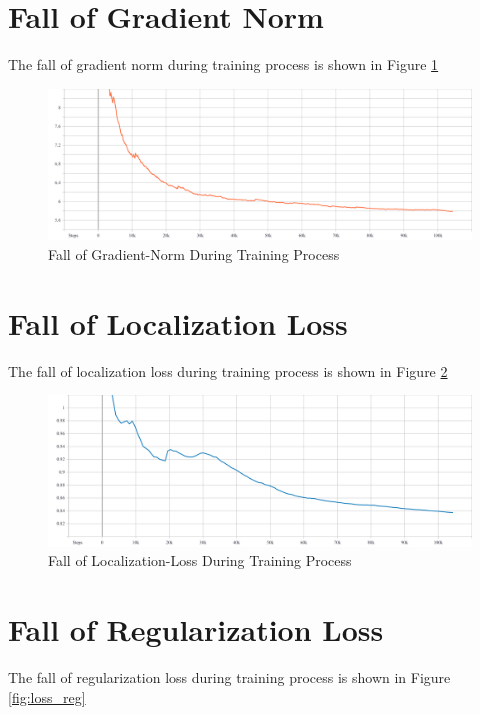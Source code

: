     \clearpage
    \section{Fall of Gradient Norm}
        The fall of gradient norm during training process is shown in Figure \ref{fig:gradient_norm}
        \begin{figure}[h]
            \centering
            \includegraphics[width=\textwidth]{images/gradient-norm.pdf}
            \caption{Fall of Gradient-Norm During Training Process}
            \label{fig:gradient_norm}
        \end{figure}
        
    \section{Fall of Localization Loss}
        The fall of localization loss during training process is shown in Figure \ref{fig:loss_loc}
        \begin{figure}[h]
            \centering
            \includegraphics[width=\textwidth]{images/loss-localization.pdf}
            \caption{Fall of Localization-Loss During Training Process}
            \label{fig:loss_loc}
        \end{figure}
        
    \section{Fall of Regularization Loss}
        The fall of regularization loss during training process is shown in Figure \ref{fig:loss_reg}
        
